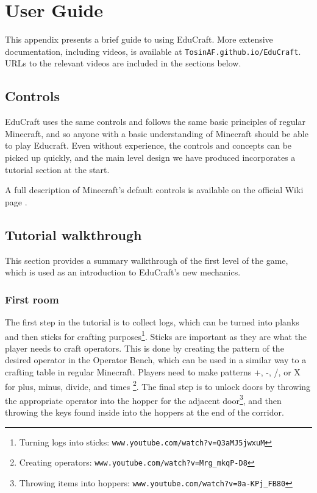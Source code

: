 \chapter{User Guide}
\label{apdx:user-guide}

This appendix presents a brief guide to using EduCraft. More extensive
documentation, including videos, is available at \texttt{TosinAF.github.io/EduCraft}.
URLs to the relevant videos are included in the sections below.

\section{Controls}
EduCraft uses the same controls and follows the same basic principles of regular Minecraft,
and so anyone with a basic understanding of Minecraft should be able to play Educraft. Even
without experience, the controls and concepts can be picked up quickly, and the main level
design we have produced incorporates a tutorial section at the start.

A full description of Minecraft's default controls is available on the official
Wiki page \cite{website:minecraft-controls}.


\section{Tutorial walkthrough}
This section provides a summary walkthrough of the first level of the game,
which is used as an introduction to EduCraft's new mechanics.

\subsection{First room}
The first step in the tutorial is to collect logs, which can be turned into planks and
then sticks for crafting purposes\footnote{Turning logs into sticks: \texttt{www.youtube.com/watch?v=Q3aMJ5jwxuM}}.
Sticks are important as they are what the player needs to craft operators. This is done by creating
the pattern of the desired operator in the Operator Bench, which can be used in a similar
way to a crafting table in regular Minecraft.
Players need to make patterns +, -, /, or X for plus, minus, divide, and times
\footnote{Creating operators: \texttt{www.youtube.com/watch?v=Mrg\_mkqP-D8}}.
The final step is to unlock doors by throwing the appropriate operator into the hopper
for the adjacent door\footnote{Throwing items into hoppers: \texttt{www.youtube.com/watch?v=0a-KPj\_FB80}},
and then throwing the keys found inside into
the hoppers at the end of the corridor.

